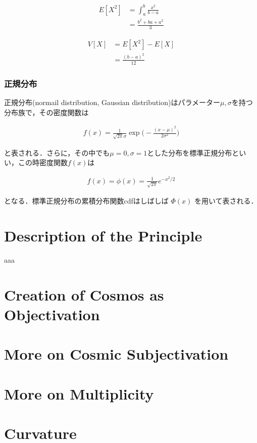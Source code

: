 \documentclass[12pt,a4j,draft]{jarticle}
\numberwithin{equation}{section}
\theoremstyle{break}
\begin{document}
\begin{align}
    E[X^2] &= \int_a^b \frac{x^2}{b-a} \\
    &= \frac{b^2 + ba + a^2}{3}
\end{align}

\begin{align}
    V[X] &= E[X^2] - E[X] \\
    &= \frac{(b-a)^2}{12}
\end{align}

\subsubsection{正規分布}

正規分布(normail distribution, Gaussian distribution)はパラメーター$\mu, \sigma$を持つ分布族で，その密度関数は

\begin{align}
    f(x) = \frac{1}{\sqrt{2\pi} \sigma} \exp \biggl( -\frac{(x-\mu)^2}{2 \sigma^2} \biggr)
\end{align}

と表される．さらに，その中でも$\mu = 0, \sigma = 1$とした分布を標準正規分布といい，この時密度関数$f(x)$は

\begin{align}
    f(x) = \phi(x) = \frac{1}{\sqrt{2 \pi}} e^{-x^2/2}
\end{align}

となる．標準正規分布の累積分布関数cdfはしばしば $\Phi (x)$ を用いて表される．


\newpage
\section{Description of the Principle}
aaa
%
\newpage
\section{Creation of Cosmos as Objectivation}
%
\newpage
\section{More on Cosmic Subjectivation}
%
\newpage
\section{More on Multiplicity}
%
\newpage
\section{Curvature}
%
\newpage
\end{document}
